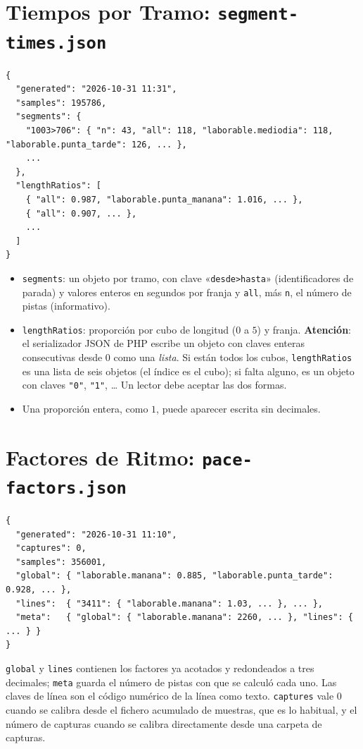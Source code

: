 \section{Tiempos por Tramo: \texttt{segment-times.json}}

\begin{lstlisting}[numbers=none]
{
  "generated": "2026-10-31 11:31",
  "samples": 195786,
  "segments": {
    "1003>706": { "n": 43, "all": 118, "laborable.mediodia": 118, "laborable.punta_tarde": 126, ... },
    ...
  },
  "lengthRatios": [
    { "all": 0.987, "laborable.punta_manana": 1.016, ... },
    { "all": 0.907, ... },
    ...
  ]
}
\end{lstlisting}

\begin{itemize}
  \item \texttt{segments}: un objeto por tramo, con clave «\texttt{desde>hasta}» (identificadores de parada) y valores
        enteros en segundos por franja y \texttt{all}, más \texttt{n}, el número de pistas (informativo).
  \item \texttt{lengthRatios}: proporción por cubo de longitud ($0$ a $5$) y franja. \textbf{Atención}: el
        serializador JSON de PHP escribe un objeto con claves enteras consecutivas desde 0 como una \emph{lista}. Si
        están todos los cubos, \texttt{lengthRatios} es una lista de seis objetos (el índice es el cubo); si falta
        alguno, es un objeto con claves \texttt{"0"}, \texttt{"1"}, \dots{} Un lector debe aceptar las dos formas.
  \item Una proporción entera, como $1$, puede aparecer escrita sin decimales.
\end{itemize}

\section{Factores de Ritmo: \texttt{pace-factors.json}}

\begin{lstlisting}[numbers=none]
{
  "generated": "2026-10-31 11:10",
  "captures": 0,
  "samples": 356001,
  "global": { "laborable.manana": 0.885, "laborable.punta_tarde": 0.928, ... },
  "lines":  { "3411": { "laborable.manana": 1.03, ... }, ... },
  "meta":   { "global": { "laborable.manana": 2260, ... }, "lines": { ... } }
}
\end{lstlisting}

\noindent \texttt{global} y \texttt{lines} contienen los factores ya acotados y redondeados a tres decimales;
\texttt{meta} guarda el número de pistas con que se calculó cada uno. Las claves de línea son el código numérico de la
línea como texto. \texttt{captures} vale 0 cuando se calibra desde el fichero acumulado de muestras, que es lo
habitual, y el número de capturas cuando se calibra directamente desde una carpeta de capturas.

